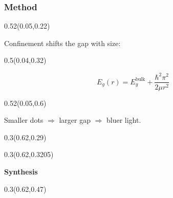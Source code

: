 \documentclass[aspectratio=169]{beamer}
\begin{document}
\begin{frame}[t]
  \frametitle{Method}

\begin{textblock}{0.52}(0.05,0.22)
{\raggedright\fontsize{15}{18}\selectfont Confinement shifts the gap with size:\par}
\end{textblock}

\begin{textblock}{0.5}(0.04,0.32)
{\centering\fontsize{22}{26}\selectfont \[E_g(r) = E_g^{\mathrm{bulk}} + \frac{\hbar^2\pi^2}{2\mu r^2}\]\par}
\end{textblock}

\begin{textblock}{0.52}(0.05,0.6)
{\raggedright\fontsize{15}{18}\selectfont Smaller dots $\Rightarrow$ larger gap $\Rightarrow$ bluer light.\par}
\end{textblock}

%
\begin{textblock}{0.3}(0.62,0.29)
\end{textblock}

\begin{textblock}{0.3}(0.62,0.3205)
{\centering\fontsize{15}{18}\selectfont \textcolor[HTML]{FFFFFF}{\textbf{Synthesis}}\par}
\end{textblock}

%
\begin{textblock}{0.3}(0.62,0.47)
\end{textblock}


\end{frame}
\end{document}

